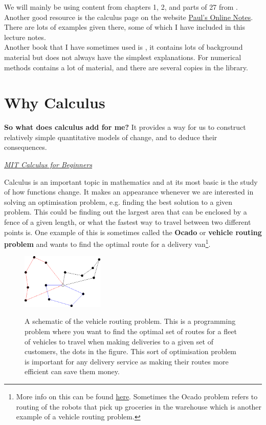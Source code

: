 We will mainly be using content from chapters 1, 2, and parts of 27 from \citep{riley_mathematical_2006}.  Another good resource is the calculus page on the website \href{https://tutorial.math.lamar.edu/classes/calci/calci.aspx}{Paul's Online Notes}. There are lots of examples given there, some of which I have included in this lecture notes.\\

Another book that I have sometimes used is \citep{jordan2008mathematical}, it contains lots of background material but does not always have the simplest explanations. For numerical methods \citep{lissamen2004mei} contains a lot of material, and there are several copies in the library.\\


\section{Why Calculus}
\label{sec:why calculus}
\epigraph{\textbf{So what does calculus add for me?} It provides a way for us to construct relatively simple quantitative models of change, and to deduce their consequences. }{\textit{\href{https://math.mit.edu/~djk/calculus_beginners/chapter00/section02.html}{MIT Calculus for Beginners}}}

Calculus is an important topic in mathematics and at its most basic is the study of how functions change. It makes an appearance whenever we are interested in solving an optimisation problem, e.g. finding the best solution to a given problem. This could be finding out the largest area that can be enclosed by a fence of a given length, or what the fastest way to travel between two different points is. One example of this is sometimes called the \textbf{Ocado} or \textbf{vehicle routing problem} and wants to find the optimal route for a delivery van\footnote{More info on this can be found \href{https://www.cardiff.ac.uk/news/view/2585000-improving-vehicle-routing-with-ocado-group}{here}. Sometimes the Ocado problem refers to routing of the robots that pick up groceries in the warehouse which is another example of a vehicle routing problem.}. \\

\begin{figure}[ht]
    \centering
    \includegraphics[width=0.35\textwidth, alt ={A schematic of the vehicle routing problem.}]{figures/vehicle_routing_problem}
    \caption{A schematic of the vehicle routing problem. This is a programming problem where you want to find the optimal set of routes for a fleet of vehicles to travel when making deliveries to a given set of customers, the dots in the figure. This sort of optimisation problem is important for any delivery service as making their routes more efficient can save them money. }
\label{fig: vehicle routing}
\end{figure}

